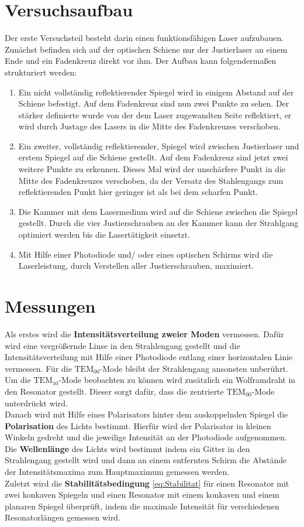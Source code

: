 \section{Versuchsaufbau}
Der erste Versuchsteil besteht darin einen funktionsfähigen Laser aufzubauen. Zunächst befinden sich auf der optischen Schiene nur der Justierlaser an einem Ende und ein Fadenkreuz direkt vor ihm. Der Aufbau kann folgendermaßen strukturiert werden:
\begin{enumerate}
	\item Ein nicht vollständig reflektierender Spiegel wird in einigem Abstand auf der Schiene befestigt. Auf dem Fadenkreuz sind nun zwei Punkte zu sehen. Der stärker definierte wurde von der dem Laser zugewandten Seite reflektiert, er wird durch Justage des Lasers in die Mitte des Fadenkreuzes verschoben.
	\item Ein zweiter, vollständig reflektierender, Spiegel wird zwischen Justierlaser und erstem Spiegel auf die Schiene gestellt. Auf dem Fadenkreuz sind jetzt zwei weitere Punkte zu erkennen. Dieses Mal wird der unschärfere Punkt in die Mitte des Fadenkreuzes verschoben, da der Versatz des Stahlengangs zum reflektierenden Punkt hier geringer ist als bei dem scharfen Punkt.
	\item Die Kammer mit dem Lasermedium wird auf die Schiene zwischen die Spiegel gestellt. Durch die vier Justierschrauben an der Kammer kann der Strahlgang optimiert werden bis die Lasertätigkeit einsetzt.
	\item Mit Hilfe einer Photodiode und/ oder eines optischen Schirms wird die Laserleistung, durch Verstellen aller Justierschrauben, maximiert.
\end{enumerate}

\section{Messungen}
Als erstes wird die \textbf{Intensitätsverteilung zweier Moden} vermessen. Dafür wird eine vergrößernde Linse in den Strahlengang gestellt und die Intensitätsverteilung mit Hilfe einer Photodiode entlang einer horizontalen Linie vermessen. Für die $\text{TEM}_{00}$-Mode bleibt der Strahlengang ansonsten unberührt. Um die $\text{TEM}_{10}$-Mode beobachten zu können wird zusätzlich ein Wolframdraht in den Resonator gestellt. Dieser sorgt dafür, dass die zentrierte $\text{TEM}_{00}$-Mode unterdrückt wird. \\
Danach wird mit Hilfe eines Polarisators hinter dem auskoppelnden Spiegel die \textbf{Polarisation} des Lichts bestimmt. Hierfür wird der Polarisator in kleinen Winkeln gedreht und die jeweilige Intensität an der Photodiode aufgenommen. \\
Die \textbf{Wellenlänge} des Lichts wird bestimmt indem ein Gitter in den Strahlengang gestellt wird und dann an einem entfernten Schirm die Abstände der Intensitätsmaxima zum Hauptmaximum gemessen werden. \\
Zuletzt wird die \textbf{Stabilitätsbedingung} \eqref{eq:Stabilitat} für einen Resonator mit zwei konkaven Spiegeln und einen Resonator mit einem konkaven und einem planaren Spiegel überprüft, indem die maximale Intensität für verschiedenen Resonatorlängen gemessen wird.